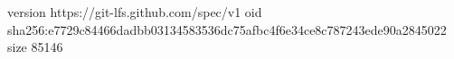 version https://git-lfs.github.com/spec/v1
oid sha256:e7729c84466dadbb03134583536dc75afbc4f6e34ce8c787243ede90a2845022
size 85146

